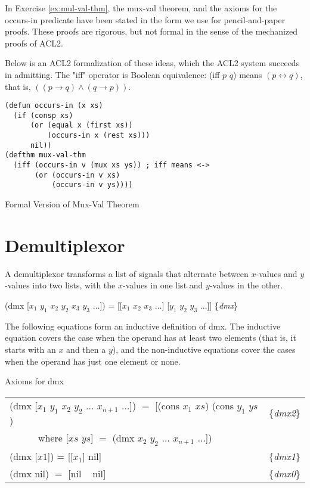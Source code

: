 \begin{aside}
In Exercise \ref{ex:mul-val-thm}, the mux-val theorem,
and the axioms for the occurs-in predicate
have been stated in the form we use for pencil-and-paper proofs.
These proofs are rigorous, but not formal
in the sense of the mechanized proofs of ACL2.

Below is an ACL2 formalization of these ideas,
which the ACL2 system succeeds in admitting.
The "iff" operator is Boolean equivalence:
(iff $p$ $q$) means $(p \leftrightarrow q)$,
that is, $((p \rightarrow q) \wedge (q \rightarrow p))$.
\\

\label{defun:occurs-in}
\begin{Verbatim}
(defun occurs-in (x xs)
  (if (consp xs)
      (or (equal x (first xs))
          (occurs-in x (rest xs)))
      nil))
(defthm mux-val-thm
  (iff (occurs-in v (mux xs ys)) ; iff means <->
       (or (occurs-in v xs)
           (occurs-in v ys))))
\end{Verbatim}
\label{defthm:mux-val}

\caption{Formal Version of Mux-Val Theorem}
\label{aside:mux-val-thm}
\end{aside}


\section{Demultiplexor}
\label{sec:dmx}

A demultiplexor transforms a list of signals that alternate between
$x$-values and $y$-values into two lists,
with the $x$-values in one list and $y$-values in the other.

\hspace{1cm} (dmx [$x_1$ $y_1$ $x_2$ $y_2$ $x_3$ $y_3$ $\dots$]) =
[[$x_1$ $x_2$ $x_3$ $\dots$] [$y_1$ $y_2$ $y_3$ $\dots$]]
\hfill \{\emph{dmx}\}

The following equations form an inductive definition of dmx.
The inductive equation covers the case when
the operand has at least two elements
(that is, it starts with an $x$ and then a $y$),
and the non-inductive equations cover the cases
when the operand has just one element or none.
\begin{center}
Axioms for dmx
\begin{tabular}{ll}
(dmx [$x_1$ $y_1$ $x_2$ $y_2$ $\dots$ $x_{n+1}$ $\dots$]) $=$ [(cons $x_1$ $xs$) (cons $y_1$ $ys$) &\{\emph{dmx2}\} \\
~~~~~~where [$xs$ $ys$] $=$ (dmx $x_2$ $y_2$ $\dots$ $x_{n+1}$ $\dots$])                           &\\
(dmx [$x1$]) =  [[$x_1$] nil]                                                                      &\{\emph{dmx1}\} \\
(dmx nil) $=$ [nil ~ nil]                                                                          &\{\emph{dmx0}\} \\
\end{tabular}
\end{center}

